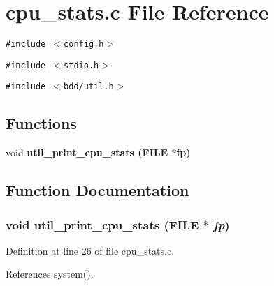 \section{cpu\_\-stats.c File Reference}
\label{cpu__stats_8c}
{\tt \#include $<$config.h$>$}\par
{\tt \#include $<$stdio.h$>$}\par
{\tt \#include $<$bdd/util.h$>$}\par
\subsection*{Functions}
\begin{CompactItemize}
\item 
void \bf{util\_\-print\_\-cpu\_\-stats} (FILE $\ast$fp)
\end{CompactItemize}


\subsection{Function Documentation}
\subsubsection{\setlength{\rightskip}{0pt plus 5cm}void util\_\-print\_\-cpu\_\-stats (FILE $\ast$ {\em fp})}\label{cpu__stats_8c_7f44c65e03ffa52c56cfccc270659da8}




Definition at line 26 of file cpu\_\-stats.c.

References system().